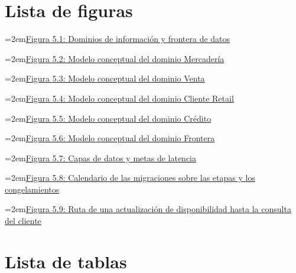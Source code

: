 \documentclass[11pt]{article}
\begin{document}
\tableofcontents
\clearpage
\section*{Lista de figuras}

\noindent\hangindent=2em\hyperref[fig:c_dom]{Figura 5.1: Dominios de información y frontera de datos}\dotfill\pageref{fig:c_dom}\par\vspace{0.4\baselineskip}
\noindent\hangindent=2em\hyperref[fig:c_merc]{Figura 5.2: Modelo conceptual del dominio Mercadería}\dotfill\pageref{fig:c_merc}\par\vspace{0.4\baselineskip}
\noindent\hangindent=2em\hyperref[fig:c_venta]{Figura 5.3: Modelo conceptual del dominio Venta}\dotfill\pageref{fig:c_venta}\par\vspace{0.4\baselineskip}
\noindent\hangindent=2em\hyperref[fig:c_cli]{Figura 5.4: Modelo conceptual del dominio Cliente Retail}\dotfill\pageref{fig:c_cli}\par\vspace{0.4\baselineskip}
\noindent\hangindent=2em\hyperref[fig:c_cred]{Figura 5.5: Modelo conceptual del dominio Crédito}\dotfill\pageref{fig:c_cred}\par\vspace{0.4\baselineskip}
\noindent\hangindent=2em\hyperref[fig:c_front]{Figura 5.6: Modelo conceptual del dominio Frontera}\dotfill\pageref{fig:c_front}\par\vspace{0.4\baselineskip}
\noindent\hangindent=2em\hyperref[fig:f18]{Figura 5.7: Capas de datos y metas de latencia}\dotfill\pageref{fig:f18}\par\vspace{0.4\baselineskip}
\noindent\hangindent=2em\hyperref[fig:f19]{Figura 5.8: Calendario de las migraciones sobre las etapas y los congelamientos}\dotfill\pageref{fig:f19}\par\vspace{0.4\baselineskip}
\noindent\hangindent=2em\hyperref[fig:f20]{Figura 5.9: Ruta de una actualización de disponibilidad hasta la consulta del cliente}\dotfill\pageref{fig:f20}\par\vspace{0.4\baselineskip}
\clearpage
\section*{Lista de tablas}
\end{document}
